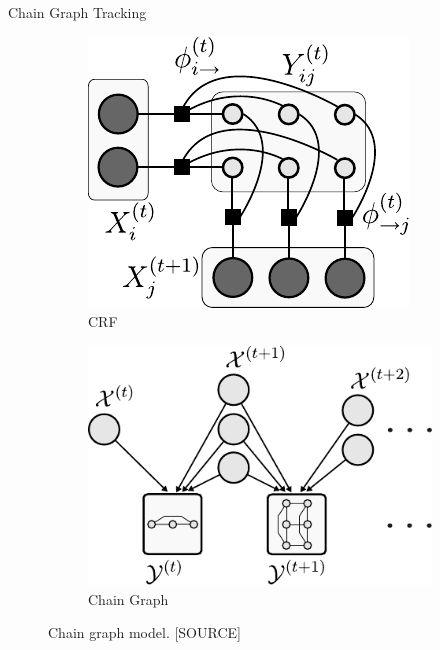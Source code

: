 \begin{frame}{Chain Graph Tracking}
    \begin{figure}
        \centering
        \begin{subfigure}[b]{0.44\textwidth}
            \centering
            \includegraphics[width=\textwidth]{images/cell_tracking/fig_crf_less_nodes.pdf}
            \caption{CRF}
            \label{fig:chaingraph-crf}
        \end{subfigure}
        \hspace{5pt}
        \begin{subfigure}[b]{0.44\textwidth}
            \centering
            \includegraphics[width=\textwidth]{images/cell_tracking/fig_chain_graph.pdf}
            \caption{Chain Graph}
            \label{fig:chaingraph-cg}
        \end{subfigure}
        \caption{Chain graph model. [SOURCE]}
        \label{fig:chaingraph-model}
    \end{figure}
\end{frame}

